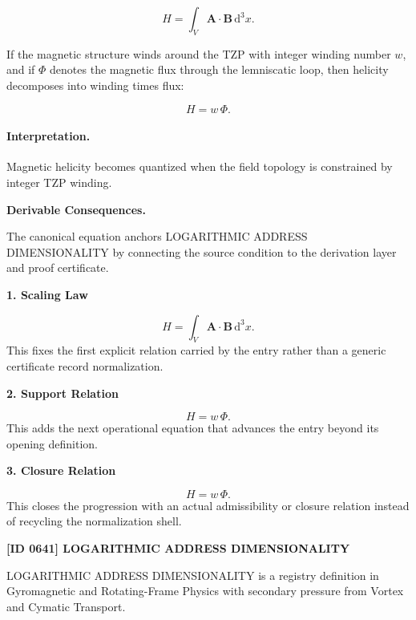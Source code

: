 \begin{equation}
H
=
\int_V
\mathbf{A}\cdot\mathbf{B}
\,\mathrm{d}^3x .
\end{equation}

If the magnetic structure winds around the TZP with integer winding number $w$, and if $\Phi$ denotes the magnetic flux through the lemniscatic loop, then helicity decomposes into winding times flux:

\begin{equation}
\boxed{
H=w\,\Phi .
}
\end{equation}

\paragraph{Interpretation.}
Magnetic helicity becomes quantized when the field topology is constrained by integer TZP winding.

\par\vspace{0.35em}
\noindent\textbf{Derivable Consequences.}\quad
\begingroup
\footnotesize
\raggedright
The canonical equation anchors LOGARITHMIC ADDRESS DIMENSIONALITY by connecting the source condition to the derivation layer and proof certificate.
\par\endgroup

\noindent\textbf{1. Scaling Law}\par
\[
H = \int_V \mathbf{A}\cdot\mathbf{B} \,\mathrm{d}^3x.
\]
\noindent This fixes the first explicit relation carried by the entry rather than a generic certificate record normalization.\par
\noindent\textbf{2. Support Relation}\par
\[
H=w\,\Phi.
\]
\noindent This adds the next operational equation that advances the entry beyond its opening definition.\par
\noindent\textbf{3. Closure Relation}\par
\[
\boxed{ H=w\,\Phi. }
\]
\noindent This closes the progression with an actual admissibility or closure relation instead of recycling the normalization shell.\par

\clearpage
\noindent\textbf{[ID 0641] LOGARITHMIC ADDRESS DIMENSIONALITY}\par
\vspace{0.35em}
\begingroup\small
{}
LOGARITHMIC ADDRESS DIMENSIONALITY is a registry definition in Gyromagnetic and Rotating-Frame Physics with secondary pressure from Vortex and Cymatic Transport.

